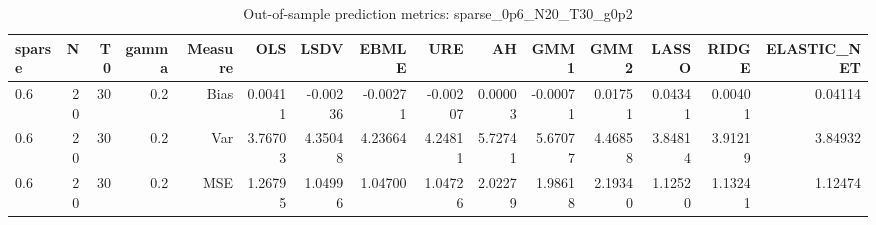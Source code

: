 \begin{table}[!htbp]\centering
\caption{Out-of-sample prediction metrics: sparse_0p6_N20_T30_g0p2}
\label{tab:table3_sparse_0p6_N20_T30_g0p2}
\begin{tabular}{lrrrrrrrrrrrrrr}
\hline
sparse & N & T0 & gamma & Measure & OLS & LSDV & EBMLE & URE & AH & GMM1 & GMM2 & LASSO & RIDGE & ELASTIC_NET \\
\hline
0.6 & 20 & 30 & 0.2 & Bias & 0.00411 & -0.00236 & -0.00271 & -0.00207 & 0.00003 & -0.00071 & 0.01751 & 0.04341 & 0.00401 & 0.04114 \\
0.6 & 20 & 30 & 0.2 & Var & 3.76703 & 4.35048 & 4.23664 & 4.24811 & 5.72741 & 5.67077 & 4.46858 & 3.84814 & 3.91219 & 3.84932 \\
0.6 & 20 & 30 & 0.2 & MSE & 1.26795 & 1.04996 & 1.04700 & 1.04726 & 2.02279 & 1.98618 & 2.19340 & 1.12520 & 1.13241 & 1.12474 \\
\hline
\end{tabular}
\end{table}

